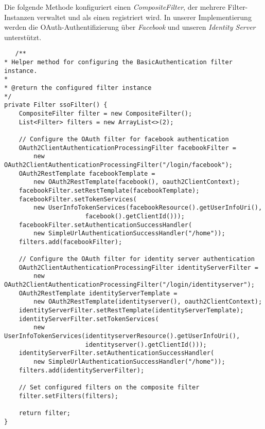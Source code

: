 Die folgende Methode konfiguriert einen \emph{CompositeFilter}, der mehrere Filter-Instanzen verwaltet und als einen registriert wird. In unserer Implementierung werden die OAuth-Authentifizierung über \emph{Facebook} und unseren \emph{Identity Server} unterstützt.
\begin{verbatim}
   /**
* Helper method for configuring the BasicAuthentication filter instance.
*
* @return the configured filter instance
*/
private Filter ssoFilter() {
	CompositeFilter filter = new CompositeFilter();
	List<Filter> filters = new ArrayList<>(2);
	
	// Configure the OAuth filter for facebook authentication
	OAuth2ClientAuthenticationProcessingFilter facebookFilter = 
		new OAuth2ClientAuthenticationProcessingFilter("/login/facebook");
	OAuth2RestTemplate facebookTemplate = 
		new OAuth2RestTemplate(facebook(), oauth2ClientContext);
	facebookFilter.setRestTemplate(facebookTemplate);
	facebookFilter.setTokenServices(
		new UserInfoTokenServices(facebookResource().getUserInfoUri(),
					  facebook().getClientId()));
	facebookFilter.setAuthenticationSuccessHandler(
		new SimpleUrlAuthenticationSuccessHandler("/home"));
	filters.add(facebookFilter);
	
	// Configure the OAuth filter for identity server authentication
	OAuth2ClientAuthenticationProcessingFilter identityServerFilter = 
		new OAuth2ClientAuthenticationProcessingFilter("/login/identityserver");
	OAuth2RestTemplate identityServerTemplate = 
		new OAuth2RestTemplate(identityserver(), oauth2ClientContext);
	identityServerFilter.setRestTemplate(identityServerTemplate);
	identityServerFilter.setTokenServices(
		new UserInfoTokenServices(identityserverResource().getUserInfoUri(), 
					  identityserver().getClientId()));
	identityServerFilter.setAuthenticationSuccessHandler(
		new SimpleUrlAuthenticationSuccessHandler("/home"));
	filters.add(identityServerFilter);
	
	// Set configured filters on the composite filter
	filter.setFilters(filters);
	
	return filter;
}
\end{verbatim}
\ \newpage

